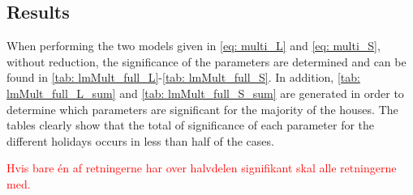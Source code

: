 



\subsection{Results}
\noindent When performing the two models given in \cref{eq: multi_L} and \cref{eq: multi_S}, without reduction, the significance of the parameters are determined and can be found in \cref{tab: lmMult_full_L}-\ref{tab: lmMult_full_S}. In addition, \cref{tab: lmMult_full_L_sum} and \cref{tab: lmMult_full_S_sum} are generated in order to determine which parameters are significant for the majority of the houses. The tables clearly show that the total of significance of each parameter for the different holidays occurs in less than half of the cases.

\textcolor{red}{Hvis bare én af retningerne har over halvdelen signifikant skal alle retningerne med.}

